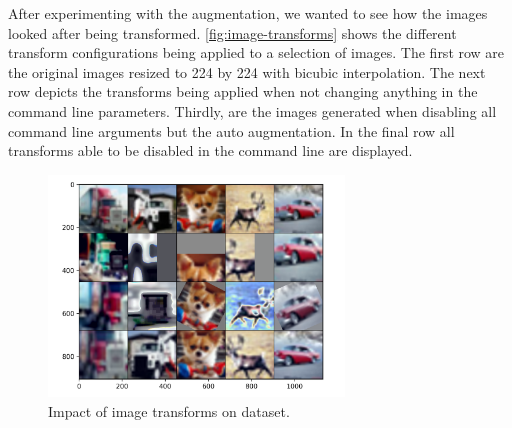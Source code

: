 \documentclass{article}
\begin{document}
After experimenting with the augmentation, we wanted to see how the images looked after being transformed.
\autoref{fig:image-transforms} shows the different transform configurations being applied to a selection of images.
The first row are the original images resized to 224 by 224 with bicubic interpolation.
The next row depicts the transforms being applied when not changing anything in the command line parameters.
Thirdly, are the images generated when disabling all command line arguments but the auto augmentation.
In the final row all transforms able to be disabled in the command line are displayed.
\begin{figure}[h]
    \centering
    \includegraphics[width=0.7\textwidth]{images/image_transforms}
    \caption{Impact of image transforms on dataset.}
    \label{fig:image-transforms}
\end{figure}
\end{document}
